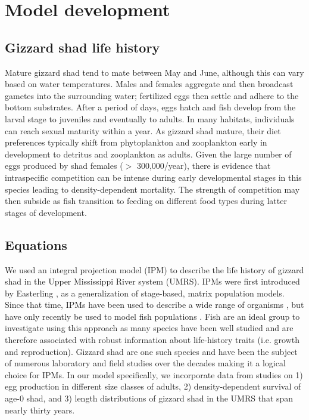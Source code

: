 \documentclass[preprint,review,12pt,authoryear]{elsarticle}
\begin{document}
\section{Model development}
\subsection{Gizzard shad life history}
Mature gizzard shad tend to mate between May and June, although this can vary based on water temperatures. 
Males and females aggregate and then broadcast gametes into the surrounding water; fertilized eggs then settle and adhere to the bottom substrates. 
After a period of days, eggs hatch and fish develop from the larval stage to juveniles and eventually to adults. 
In many habitats, individuals can reach sexual maturity within a year. 
As gizzard shad mature, their diet preferences typically shift from phytoplankton and zooplankton early in development to detritus and zooplankton as adults. 
Given the large number of eggs produced by shad females ($>$ 300,000/year), there is evidence that intraspecific competition can be intense during early developmental stages in this species leading to density-dependent mortality. 
The strength of competition may then subside as fish transition to feeding on different food types during latter stages of development.   

\subsection{Equations}
We used an integral projection model (IPM) to describe the life history of gizzard shad in the Upper Mississippi River system (UMRS). 
IPMs were first introduced by Easterling \citep{easterling2000size}, as a generalization of stage-based, matrix population models. 
Since that time, IPMs have been used to describe a wide range of organisms \citep{ellner2016data, merow2014advancing, rees2014building}, but have only recently be used to model fish populations \citep{erickson2017integral, liao2019dynamic, white2016fitting, pollesch2022developing}. 
Fish are an ideal group to investigate using this approach as many species have been well studied and are therefore associated with robust information about life-history traits (i.e. growth and reproduction). 
Gizzard shad are one such species and have been the subject of numerous laboratory and field studies over the decades making it a logical choice for IPMs.
In our model specifically, we incorporate data from studies on 1) egg production in different size classes of adults, 2) density-dependent survival of age-0 shad, and 3) length distributions of gizzard shad in the UMRS that span nearly thirty years.
\end{document}
